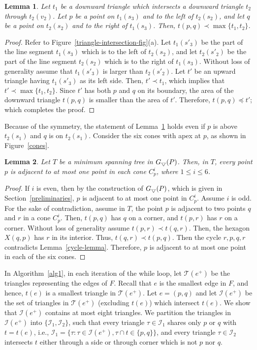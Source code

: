 \documentclass[11pt,a4paper]{article}
\newcommand{\tr}[1]{t(#1)}
\newcommand{\cone}[2]{C^{#1}_{#2}}
\newcommand{\hex}[2]{X(#1,#2)}
\newcommand{\G}[2]{G_{#1}({#2})}
\newcommand{\trids}{\scriptsize\bigtriangledown}
\newtheorem{lemma}{Lemma}
\begin{document}
\begin{lemma}
 \label{triangle-intersection-lemma}
Let $t_1$ be a downward triangle which intersects a downward triangle $t_2$ through $t_2(v_2)$. Let $p$ be a point on $t_1(s_3)$ and to the left of $t_2(s_2)$, and let $q$ be a point on $t_2(s_2)$ and to the right of $t_1(s_3)$. Then, $\tr{p,q}\prec\max\{t_1,t_2\}$.
\end{lemma}
\begin{proof}
 Refer to Figure~\ref{triangle-intersection-fig}(a). Let $t_1(s'_3)$ be the part of the line segment $t_1(s_3)$ which is to the left of $t_2(s_2)$, and let $t_2(s'_2)$ be the part of the line segment $t_2(s_2)$ which is to the right of $t_1(s_3)$. Without loss of generality assume that $t_1(s'_3)$ is larger than $t_2(s'_2)$. Let $t'$ be an upward triangle having $t_1(s'_3)$ as its left side. Then, $t'\prec t_1$, which implies that $t'\prec\max\{t_1,t_2\}$. Since $t'$ has both $p$ and $q$ on its boundary, the area of the downward triangle $t(p,q)$ is smaller than the area of $t'$. Therefore, $\tr{p,q}\preceq t'$; which completes the proof.
\end{proof}

Because of the symmetry, the statement of Lemma~\ref{triangle-intersection-lemma} holds even if $p$ is above $t_2(s_1)$ and $q$ is on $t_2(s_1)$.
Consider the six cones with apex at $p$, as shown in Figure~\ref{cones}.
\begin{lemma}
\label{deg-six-half}
Let $T$ be a minimum spanning tree in $\G{\trids}{P}$. Then, in $T$, every point $p$ is adjacent to at most one point in each cone $\cone{i}{p}$, where $1\le i\le 6$.
\end{lemma}
\begin{proof}
If $i$ is even, then by the construction of $\G{\trids}{P}$, which is given in Section~\ref{preliminaries}, $p$ is adjacent to at most one point in $\cone{i}{p}$. Assume $i$ is odd. For the sake of contradiction, assume in $T$, the point $p$ is adjacent to two points $q$ and $r$ in a cone $\cone{i}{p}$. Then, $t(p,q)$ has $q$ on a corner, and $t(p,r)$ has $r$ on a corner. Without loss of generality assume $t(p,r)\prec t(q,r)$. Then, the hexagon $\hex{q}{p}$ has $r$ in its interior. Thus, $\tr{q,r}\prec \tr{p,q}$. Then the cycle $r,p,q,r$ contradicts Lemma~\ref{cycle-lemma}. Therefore, $p$ is adjacent to at most one point in each of the six cones.
\end{proof}


In Algorithm~\ref{alg1}, in each iteration of the {\sf while} loop, let $\mathcal{T}(e^+)$ be the triangles representing the edges of $F$. Recall that $e$ is the smallest edge in $F$, and hence, $t(e)$ is a smallest triangle in $\mathcal{T}(e^+)$.
Let $e=(p,q)$ and let $\mathcal{I}(e^+)$ be the set of triangles in $\mathcal{T}(e^+)$ (excluding $t(e)$) which intersect $t(e)$. We show that $\mathcal{I}(e^+)$ contains at most eight triangles.
We partition the triangles in $\mathcal{I}(e^+)$ into $\{\mathcal{I}_1,\mathcal{I}_2\}$, such that every triangle $\tau\in\mathcal{I}_1$ shares only $p$ or $q$ with $t=t(e)$, i.e., $\mathcal{I}_1=\{\tau: \tau\in\mathcal{I}(e^+),\tau\cap t\in \{p,q\}\}$, and every triangle $\tau\in\mathcal{I}_2$ intersects $t$ either through a side or through corner which is not $p$ nor $q$.
\end{document}
